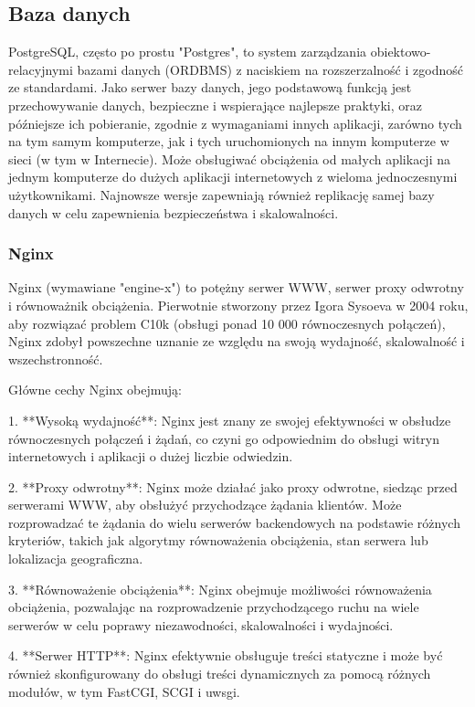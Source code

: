 \subsection{Baza danych}
PostgreSQL, często po prostu "Postgres", to system zarządzania obiektowo-relacyjnymi bazami danych (ORDBMS) z naciskiem na rozszerzalność i zgodność ze standardami. Jako serwer bazy danych, jego podstawową funkcją jest przechowywanie danych, bezpieczne i wspierające najlepsze praktyki, oraz późniejsze ich pobieranie, zgodnie z wymaganiami innych aplikacji, zarówno tych na tym samym komputerze, jak i tych uruchomionych na innym komputerze w sieci (w tym w Internecie). Może obsługiwać obciążenia od małych aplikacji na jednym komputerze do dużych aplikacji internetowych z wieloma jednoczesnymi użytkownikami. Najnowsze wersje zapewniają również replikację samej bazy danych w celu zapewnienia bezpieczeństwa i skalowalności.

\subsubsection{Nginx}
Nginx (wymawiane "engine-x") to potężny serwer WWW, serwer proxy odwrotny i równoważnik obciążenia. Pierwotnie stworzony przez Igora Sysoeva w 2004 roku, aby rozwiązać problem C10k (obsługi ponad 10 000 równoczesnych połączeń), Nginx zdobył powszechne uznanie ze względu na swoją wydajność, skalowalność i wszechstronność.

Główne cechy Nginx obejmują:

1. **Wysoką wydajność**: Nginx jest znany ze swojej efektywności w obsłudze równoczesnych połączeń i żądań, co czyni go odpowiednim do obsługi witryn internetowych i aplikacji o dużej liczbie odwiedzin.

2. **Proxy odwrotny**: Nginx może działać jako proxy odwrotne, siedząc przed serwerami WWW, aby obsłużyć przychodzące żądania klientów. Może rozprowadzać te żądania do wielu serwerów backendowych na podstawie różnych kryteriów, takich jak algorytmy równoważenia obciążenia, stan serwera lub lokalizacja geograficzna.

3. **Równoważenie obciążenia**: Nginx obejmuje możliwości równoważenia obciążenia, pozwalając na rozprowadzenie przychodzącego ruchu na wiele serwerów w celu poprawy niezawodności, skalowalności i wydajności.

4. **Serwer HTTP**: Nginx efektywnie obsługuje treści statyczne i może być również skonfigurowany do obsługi treści dynamicznych za pomocą różnych modułów, w tym FastCGI, SCGI i uwsgi.

